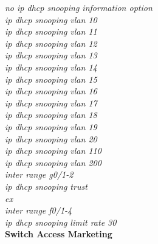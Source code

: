 \documentclass[12pt,a4paper]{report}
\begin{document}
\hspace*{2cm}\textit{no ip dhcp snooping information option\\
\hspace*{2cm}ip dhcp snooping vlan 10\\
\hspace*{2cm}ip dhcp snooping vlan 11\\
\hspace*{2cm}ip dhcp snooping vlan 12\\
\hspace*{2cm}ip dhcp snooping vlan 13\\
\hspace*{2cm}ip dhcp snooping vlan 14\\
\hspace*{2cm}ip dhcp snooping vlan 15\\
\hspace*{2cm}ip dhcp snooping vlan 16\\
\hspace*{2cm}ip dhcp snooping vlan 17\\
\hspace*{2cm}ip dhcp snooping vlan 18\\
\hspace*{2cm}ip dhcp snooping vlan 19\\
\hspace*{2cm}ip dhcp snooping vlan 20\\
\hspace*{2cm}ip dhcp snooping vlan 110\\
\hspace*{2cm}ip dhcp snooping vlan 200\\
\hspace*{2cm}inter range g0/1-2\\
\hspace*{2cm}ip dhcp snooping trust\\
\hspace*{2cm}ex\\
\hspace*{2cm}inter range f0/1-4\\
\hspace*{2cm}ip dhcp snooping limit rate 30\\}
\hspace*{1cm}\textbf{Switch Access Marketing}\\
\end{document}
